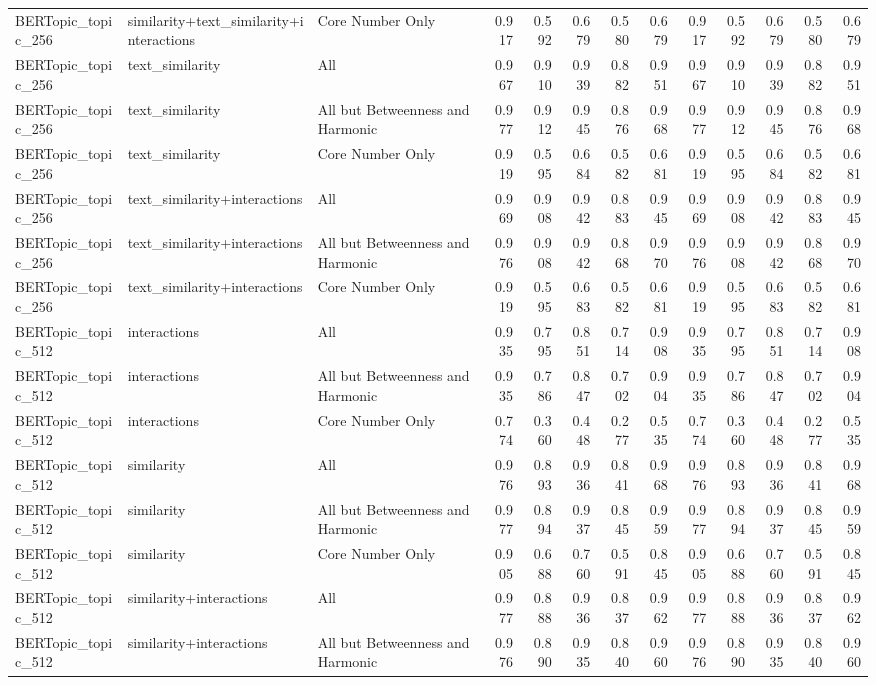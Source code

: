 \begin{tabular}{lllrrrrrrrrrr}
BERTopic_topic_256 & similarity+text_similarity+interactions & Core Number Only & 0.917 & 0.592 & 0.679 & 0.580 & 0.679 & 0.917 & 0.592 & 0.679 & 0.580 & 0.679 \\
BERTopic_topic_256 & text_similarity & All & 0.967 & 0.910 & 0.939 & 0.882 & 0.951 & 0.967 & 0.910 & 0.939 & 0.882 & 0.951 \\
BERTopic_topic_256 & text_similarity & All but Betweenness and Harmonic & 0.977 & 0.912 & 0.945 & 0.876 & 0.968 & 0.977 & 0.912 & 0.945 & 0.876 & 0.968 \\
BERTopic_topic_256 & text_similarity & Core Number Only & 0.919 & 0.595 & 0.684 & 0.582 & 0.681 & 0.919 & 0.595 & 0.684 & 0.582 & 0.681 \\
BERTopic_topic_256 & text_similarity+interactions & All & 0.969 & 0.908 & 0.942 & 0.883 & 0.945 & 0.969 & 0.908 & 0.942 & 0.883 & 0.945 \\
BERTopic_topic_256 & text_similarity+interactions & All but Betweenness and Harmonic & 0.976 & 0.908 & 0.942 & 0.868 & 0.970 & 0.976 & 0.908 & 0.942 & 0.868 & 0.970 \\
BERTopic_topic_256 & text_similarity+interactions & Core Number Only & 0.919 & 0.595 & 0.683 & 0.582 & 0.681 & 0.919 & 0.595 & 0.683 & 0.582 & 0.681 \\
BERTopic_topic_512 & interactions & All & 0.935 & 0.795 & 0.851 & 0.714 & 0.908 & 0.935 & 0.795 & 0.851 & 0.714 & 0.908 \\
BERTopic_topic_512 & interactions & All but Betweenness and Harmonic & 0.935 & 0.786 & 0.847 & 0.702 & 0.904 & 0.935 & 0.786 & 0.847 & 0.702 & 0.904 \\
BERTopic_topic_512 & interactions & Core Number Only & 0.774 & 0.360 & 0.448 & 0.277 & 0.535 & 0.774 & 0.360 & 0.448 & 0.277 & 0.535 \\
BERTopic_topic_512 & similarity & All & 0.976 & 0.893 & 0.936 & 0.841 & 0.968 & 0.976 & 0.893 & 0.936 & 0.841 & 0.968 \\
BERTopic_topic_512 & similarity & All but Betweenness and Harmonic & 0.977 & 0.894 & 0.937 & 0.845 & 0.959 & 0.977 & 0.894 & 0.937 & 0.845 & 0.959 \\
BERTopic_topic_512 & similarity & Core Number Only & 0.905 & 0.688 & 0.760 & 0.591 & 0.845 & 0.905 & 0.688 & 0.760 & 0.591 & 0.845 \\
BERTopic_topic_512 & similarity+interactions & All & 0.977 & 0.888 & 0.936 & 0.837 & 0.962 & 0.977 & 0.888 & 0.936 & 0.837 & 0.962 \\
BERTopic_topic_512 & similarity+interactions & All but Betweenness and Harmonic & 0.976 & 0.890 & 0.935 & 0.840 & 0.960 & 0.976 & 0.890 & 0.935 & 0.840 & 0.960 \\

\end{tabular}

